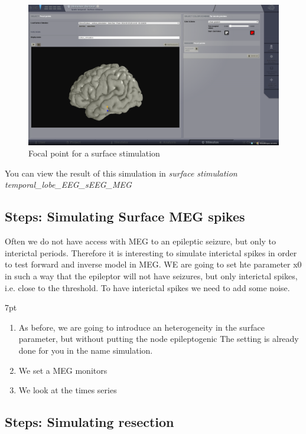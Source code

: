 \documentclass{tufte-handout}
\newenvironment{simulation}{%
  \def\FrameCommand{%
    \hspace{1pt}%
    {\color{ForestGreen}\vrule width 2pt}%
    {\color{simulationshade}\vrule width 4pt}%
    \colorbox{simulationshade}%
  }%
  \MakeFramed{\advance\hsize-\width\FrameRestore}%
  \noindent\hspace{-4.55pt}%
  \begin{adjustwidth}{}{7pt}%
  \vspace{2pt}\vspace{2pt}%
}
{%
  \vspace{2pt}\end{adjustwidth}\endMakeFramed%
}
\begin{document}
\begin{figure}[h]
  \includegraphics[width=\linewidth]{Handout_UI_ModellingAnEpilepticPatient_StimulationFocalPoint}%
  \caption{Focal point for a surface stimulation}%
  \label{fig:stim_foc}%
\end{figure}

You can view the result of this simulation in \textit{surface stimulation temporal\_lobe\_EEG\_sEEG\_MEG}
\subsection{Steps: Simulating Surface MEG spikes}

Often we do not have access with MEG to an epileptic seizure, but only to interictal periods.
Therefore it is interesting to simulate interictal spikes in order to test forward and inverse model in MEG.
WE are going to set hte parameter x0 in such a way that the epileptor will not have seizures, but only interictal spikes, 
i.e. close to the threshold. To have interictal spikes we need to add some noise.

  \begin{simulation}
  \begin{enumerate}
  \item As before, we are going to introduce an heterogeneity in the surface parameter, but without putting the node epileptogenic
  The setting is already done for you in the name simulation.
  \item We set a MEG monitors
  \item We look at the times series
\end{enumerate}
\end{simulation}

\subsection{Steps: Simulating resection}
\end{document}
